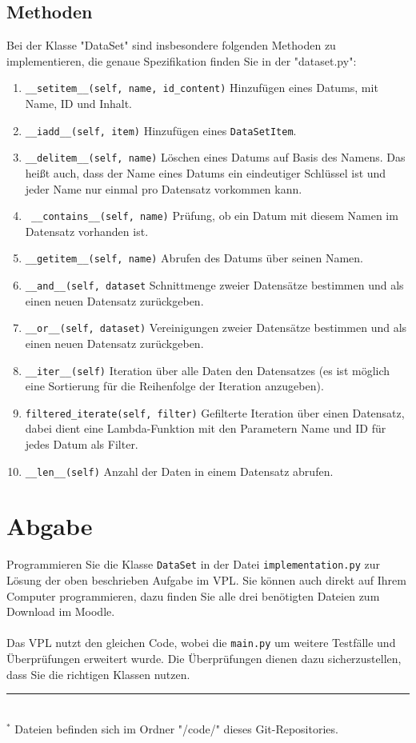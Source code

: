 \documentclass[a4paper]{article}
\begin{document}
\subsection{Methoden}
\thispagestyle{empty}

Bei der Klasse "DataSet" sind insbesondere folgenden Methoden zu implementieren, die genaue Spezifikation finden Sie in der "dataset.py":\\

\begin{enumerate}
    \item \texttt{\_\_setitem\_\_(self, name, id\_content)} Hinzufügen eines Datums, mit Name, ID und Inhalt.
    \item \texttt{\_\_iadd\_\_(self, item)} Hinzufügen eines \texttt{DataSetItem}.
    \item \texttt{\_\_delitem\_\_(self, name)} Löschen eines Datums auf Basis des Namens. Das heißt auch, dass der Name eines Datums ein eindeutiger Schlüssel ist und jeder Name nur einmal pro Datensatz vorkommen kann.
    \item \texttt{ \_\_contains\_\_(self, name)} Prüfung, ob ein Datum mit diesem Namen im Datensatz vorhanden ist.
    \item \texttt{\_\_getitem\_\_(self, name)} Abrufen des Datums über seinen Namen.
    \item \texttt{\_\_and\_\_(self, dataset} Schnittmenge zweier Datensätze bestimmen und als einen neuen Datensatz zurückgeben.
    \item \texttt{\_\_or\_\_(self, dataset)} Vereinigungen zweier Datensätze bestimmen und als einen neuen Datensatz zurückgeben.
    \item \texttt{\_\_iter\_\_(self)} Iteration über alle Daten den Datensatzes (es ist möglich eine Sortierung für die Reihenfolge der Iteration anzugeben).
    \item \texttt{filtered\_iterate(self, filter)} Gefilterte Iteration über einen Datensatz, dabei dient eine Lambda-Funktion mit den Parametern Name und ID für jedes Datum als Filter.
    \item \texttt{\_\_len\_\_(self)} Anzahl der Daten in einem Datensatz abrufen.
\end{enumerate}

\section{Abgabe}

Programmieren Sie die Klasse \texttt{DataSet} in der Datei \texttt{implementation.py} zur Lösung der oben beschrieben Aufgabe im VPL.
Sie können auch direkt auf Ihrem Computer programmieren, dazu finden Sie alle drei benötigten Dateien zum Download im Moodle.\\
\\
Das VPL nutzt den gleichen Code, wobei die \texttt{main.py} um weitere Testfälle und Überprüfungen erweitert wurde.
Die Überprüfungen dienen dazu sicherzustellen, dass Sie die richtigen Klassen nutzen.\\
%
\hrule\hfill\\[0.2cm]
$^*$ Dateien befinden sich im Ordner "/code/" dieses Git-Repositories.\\
\end{document}
